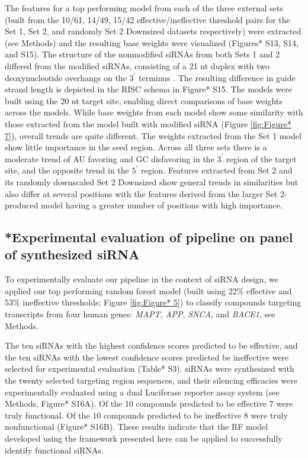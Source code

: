 \documentclass{report}
\begin{document}
 The features for a top performing model from each of the three external sets (built from the 10/61, 14/49, 15/42 effective/ineffective threshold pairs for the Set 1, Set 2, and randomly Set 2 Downsized datasets respectively) were extracted (see Methods) and the resulting base weights were visualized (Figures* S13, S14, and S15). The structure of the nonmodified siRNAs from both Sets 1 and 2 differed from the modified siRNAs, consisting of a 21 nt duplex with two deoxynucleotide overhangs on the $3^\prime$ terminus \cite{huesken_design_2005,reynolds_rational_2004}. The resulting difference in guide strand length is depicted in the RISC schema in Figure* S15. The models were built using the 20 nt target site, enabling direct comparisons of base weights across the models. While base weights from each model show some similarity with those extracted from the model built with modified siRNA (Figure \ref{fig:Figure* 7}), overall trends are quite different. The weights extracted from the Set 1 model show little importance in the seed region. Across all three sets there is a moderate trend of AU favoring and GC disfavoring in the $3^\prime$ region of the target site, and the opposite trend in the $5^\prime$ region. Features extracted from Set 2 and its randomly downscaled Set 2 Downsized show general trends in similarities but also differ at several positions with the features derived from the larger Set 2-produced model having a greater number of positions with high importance.
 
\subsection{*Experimental evaluation of pipeline on panel of synthesized siRNA}

To experimentally evaluate our pipeline in the context of siRNA design, we applied our top performing random forest model (built using 22\% effective and 53\% ineffective thresholds; Figure \ref{fig:Figure* 5}) to classify compounds targeting transcripts from four human genes: \textit{MAPT}, \textit{APP}, \textit{SNCA}, and \textit{BACE1}, see Methods. 

 The ten siRNAs with the highest confidence scores predicted to be effective, and the ten siRNAs with the lowest confidence scores predicted be ineffective were selected for experimental evaluation (Table* S3). siRNAs were synthesized with the twenty selected targeting region sequences, and their silencing efficacies were experimentally evaluated using a dual Luciferase reporter assay system (see Methods, Figure* S16A). Of the 10 compounds predicted to be effective 7 were truly functional. Of the 10 compounds predicted to be ineffective 8 were truly nonfunctional (Figure* S16B). These results indicate that the RF model developed using the framework presented here can be applied to successfully identify functional siRNAs. 
\end{document}
